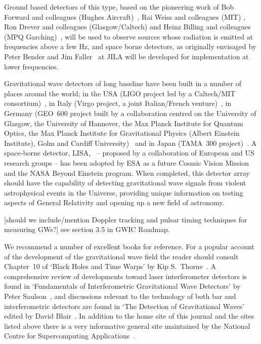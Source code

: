 \documentclass{article}
\begin{document}
Ground based detectors of this type, based on the pioneering work of Bob Forward
and colleagues (Hughes Aircraft)~\cite{Forward}, Rai Weiss and colleagues (MIT)
\cite{Weiss}, Ron Drever and colleagues (Glasgow/Caltech) \cite{Drever1,
Drever2} and Heinz Billing and colleagues (MPQ Garching)~\cite{Billing}, will be
used to observe sources whose radiation is emitted at frequencies above a few
Hz, and space borne detectors, as originally envisaged by Peter Bender and Jim
Faller~\cite{BenderFaller1, BenderFaller2} at JILA will be developed for
implementation at lower frequencies.

Gravitational wave detectors of long baseline have been built in a number of
places around the world; in the USA (LIGO project led by a Caltech/MIT
consortium)~\cite{LIGOS5, LIGOweb}, in Italy (Virgo project, a joint
Italian/French venture)~\cite{Acernese:2007, Virgoweb}, in Germany (GEO~600
project built by a collaboration centred on the University of Glasgow, the
University of Hannover, the Max Planck Institute for Quantum Optics, the Max
Planck Institute for Gravitational Physics (Albert Einstein Institute), Golm and
Cardiff University)~\cite{Willke:2007, GEOweb} and in Japan (TAMA~300
project)~\cite{TAMAStatus, TAMAweb}. A space-borne detector, LISA,~\cite{LISA,
NASAweb, ESAweb} -- proposed by a collaboration of European and US research
groups -- has been adopted by ESA as a future Cosmic Vision Mission and the NASA
Beyond Einstein program. When completed, this detector array should have the
capability of detecting gravitational wave signals from violent astrophysical
events in the Universe, providing unique information on testing aspects of
General Relativity and opening up a new field of astronomy.

[should we include/mention Doppler tracking and pulsar timing techniques for measuring GWs?] see section 3.5 in GWIC Roadmap.


We recommend a number of excellent books for reference. For a popular account of
the development of the gravitational wave field the reader should consult
Chapter~10 of `Black Holes and Time Warps' by Kip S.\ Thorne~\cite{Thorne}. A
comprehensive review of developments toward laser interferometer detectors is
found in `Fundamentals of Interferometric Gravitational Wave Detectors' by Peter
Saulson~\cite{Saulsonbook}, and discussions relevant to the technology of both
bar and interferometric detectors are found in `The Detection of Gravitational
Waves' edited by David Blair~\cite{Blair}. In addition to the home site of this
journal and the sites listed above there is a very informative general site
maintained by the National Centre for Supercomputing Applications~\cite{NCSA}.
\end{document}
